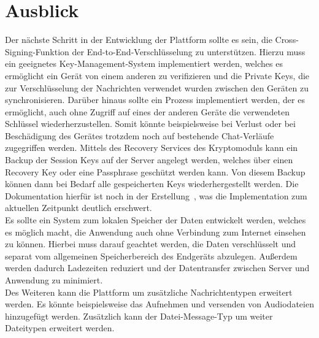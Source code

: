     \chapter{Ausblick}\label{ch:ausblick}
    Der nächste Schritt in der Entwicklung der Plattform sollte es sein, die Cross-Signing-Funktion der End-to-End-Verschlüsselung zu unterstützen.
    Hierzu muss ein geeignetes Key-Management-System implementiert werden, welches es ermöglicht ein Gerät von einem anderen zu verifizieren und die Private Keys, die zur Verschlüsselung der Nachrichten verwendet wurden zwischen den Geräten zu synchronisieren.
    Darüber hinaus sollte ein Prozess implementiert werden, der es ermöglicht, auch ohne Zugriff auf eines der anderen Geräte die verwendeten Schlüssel wiederherzustellen.
    Somit könnte beispielsweise bei Verlust oder bei Beschädigung des Gerätes trotzdem noch auf bestehende Chat-Verläufe zugegriffen werden.
    Mittels des Recovery Services des Kryptomoduls kann ein Backup der Session Keys auf der Server angelegt werden, welches über einen Recovery Key oder eine Passphrase geschützt werden kann.
    Von diesem Backup können dann bei Bedarf alle gespeicherten Keys wiederhergestellt werden.
    Die Dokumentation hierfür ist noch in der Erstellung~\cite{advancede2e}, was die Implementation zum aktuellen Zeitpunkt deutlich erschwert.\\
    Es sollte ein System zum lokalen Speicher der Daten entwickelt werden, welches es möglich macht, die Anwendung auch ohne Verbindung zum Internet einsehen zu können.
    Hierbei muss darauf geachtet werden, die Daten verschlüsselt und separat vom allgemeinen Speicherbereich des Endgeräts abzulegen.
    Außerdem werden dadurch Ladezeiten reduziert und der Datentransfer zwischen Server und Anwendung zu minimiert.\\
    Des Weiteren kann die Plattform um zusätzliche Nachrichtentypen erweitert werden.
    Es könnte beispielsweise das Aufnehmen und versenden von Audiodateien hinzugefügt werden.
    Zusätzlich kann der Datei-Message-Typ um weiter Dateitypen erweitert werden.

%

